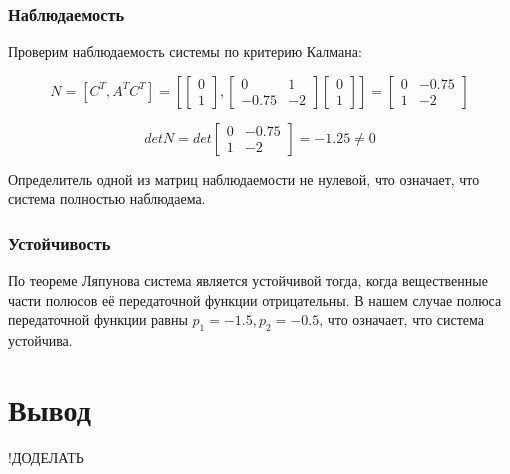 \documentclass[14pt,a4paper,report]{report}
\begin{document}
\subsubsection{Наблюдаемость}

Проверим наблюдаемость системы по критерию Калмана:

\begin{equation*}
\text{$N=[C^T,A^TC^T]=[\begin{bmatrix} 0 \\ 1 \end{bmatrix},\begin{bmatrix} 0 & 1 \\ -0.75 & -2 \end{bmatrix}\begin{bmatrix} 0 \\ 1 \end{bmatrix}]=\begin{bmatrix} 0 & -0.75 \\ 1 & -2 \end{bmatrix}$}
\end{equation*}

\begin{equation*}
\text{$detN=det\begin{bmatrix} 0 & -0.75 \\ 1 & -2 \end{bmatrix}=-1.25\neq 0$}
\end{equation*}

Определитель одной из матриц наблюдаемости не нулевой, что означает, что система полностью наблюдаема.

\subsubsection{Устойчивость}

По теореме Ляпунова система является устойчивой тогда, когда вещественные части полюсов её передаточной функции отрицательны. В нашем случае полюса передаточной функции равны $p_1=-1.5, p_2=-0.5$, что означает, что система устойчива. 

\section{Вывод}

!ДОДЕЛАТЬ
\end{document}
